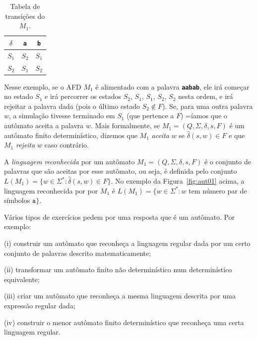 \documentclass[
	12pt,				%
	openany,
	oneside,
	a4paper,			%
	english,			%
	brazil,				%
	]{abntex2}
\begin{document}
\begin{table}[H]
	\centering
	\begin{tabular}[H]{c|c c}
		$\delta$ & \textbf{\texttt{a}} & \textbf{\texttt{b}} \\
		\hline
		$S_1$    & $S_2$               & $S_1$               \\
		$S_2$    & $S_1$               & $S_2$
	\end{tabular}
	\caption{Tabela de transições do $M_1$.}
	\label{tab:tabTransicoesM1}
	\vspace{-0.5cm}
\end{table}


Nesse exemplo, se o AFD $M_1$ é alimentado com a palavra \textbf{\texttt{aabab}}, ele irá começar no estado $S_1$ e irá percorrer os estados $S_2$, $S_1$, $S_1$, $S_2$, $S_2$ nesta ordem, e irá rejeitar a palavra dada (pois o último estado $S_2 \not\in F$). Se, para uma outra palavra $w$, a simulação tivesse terminado em $S_1$ (que pertence a $F$) =íamos que o autômato aceita a palavra $w$. Mais formalmente, se $M_1 = (Q, \Sigma, \delta, s, F)$ é um autômato finito determinístico, dizemos que $M_1$ \emph{aceita} $w$ se $\hat{\delta}(s, w) \in F$ e que $M_1$ \emph{rejeita} $w$ caso contrário.

A \emph{linguagem reconhecida} por um autômato $M_1 = (Q, \Sigma, \delta, s, F)$ é o conjunto de palavras que são aceitas por esse autômato, ou seja, é definida pelo conjunto $ L(M_1) = \{w \in \Sigma^* \colon \hat{\delta}(s, w) \in F \}$. No exemplo da Figura~\ref{fig:aut01} acima, a linguagem reconhecida por por $M_1$ é $L(M_1) = \{w \in \Sigma^* :  w$  tem número par de símbolos $\mathtt{a}\}$.

\bigskip

Vários tipos de exercícios pedem por uma resposta que é um autômato. Por exemplo:
\begin{alineas}%
	\item[(i)] construir um autômato que reconheça a linguagem regular
	dada por um certo conjunto de palavras descrito matematicamente;
	\item[(ii)] transformar um autômato finito não determinístico num
	determinístico equivalente;
	\item[(iii)] criar um autômato que reconheça a mesma linguagem
	descrita por uma expressão regular dada;
	\item[(iv)] construir o menor autômato finito determinístico
	que reconheça uma certa linguagem regular.
\end{alineas}
\end{document}
